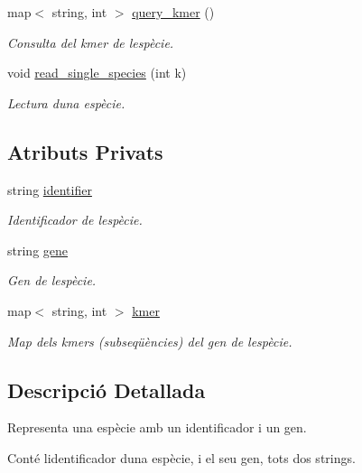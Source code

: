 \begin{DoxyCompactItemize}
map$<$ string, int $>$ \hyperlink{class_especie_ab446000c51668cabe39fb2b72ed5fff0}{query\+\_\+kmer} ()
\begin{DoxyCompactList}\small\item\em Consulta del kmer de l\textquotesingle{}espècie. \end{DoxyCompactList}\item 
void \hyperlink{class_especie_a1a60c5306ae621527bb9183a5c64583f}{read\+\_\+single\+\_\+species} (int k)
\begin{DoxyCompactList}\small\item\em Lectura d\textquotesingle{}una espècie. \end{DoxyCompactList}\end{DoxyCompactItemize}
\subsection*{Atributs Privats}
\begin{DoxyCompactItemize}
\item 
string \hyperlink{class_especie_a2c63b7e3b74779e58feb0a2446faabd1}{identifier}
\begin{DoxyCompactList}\small\item\em Identificador de l\textquotesingle{}espècie. \end{DoxyCompactList}\item 
string \hyperlink{class_especie_affa45d2f858415333f43caf121c7663a}{gene}
\begin{DoxyCompactList}\small\item\em Gen de l\textquotesingle{}espècie. \end{DoxyCompactList}\item 
map$<$ string, int $>$ \hyperlink{class_especie_aa438e3e2f785d96c0ac51e83f60a5879}{kmer}
\begin{DoxyCompactList}\small\item\em Map dels kmers (subseqüències) del gen de l\textquotesingle{}espècie. \end{DoxyCompactList}\end{DoxyCompactItemize}


\subsection{Descripció Detallada}
Representa una espècie amb un identificador i un gen. 

Conté l\textquotesingle{}identificador d\textquotesingle{}una espècie, i el seu gen, tots dos strings. 

